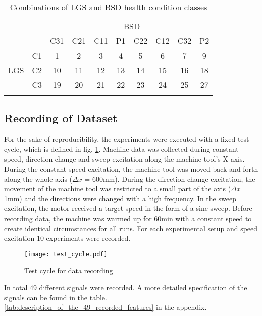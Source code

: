 \begin{center}
\begin{longtable}{c c c c c c c c c c} 
\toprule
  &  &    &     &     &     \multicolumn{2}{c}{BSD}     &     &     &    \\ 
  &  & C31 & C21 & C11 & P1  & C22 & C12 & C32 & P2 \\ 
\midrule
     & \multicolumn{1}{c|}{C1} & 1 & 2 & 3 & 4 & 5 & 6 & 7 & 9 \\ 
 LGS & \multicolumn{1}{c|}{C2}& 10 & 11 & 12 & 13 & 14 & 15 & 16 & 18 \\  
     & \multicolumn{1}{c|}{C3} & 19 & 20 & 21 & 22 & 23 & 24 & 25 & 27 \\ 
\bottomrule
\caption {Combinations of LGS and BSD health condition classes}
\label {tab:recorded_combinations_of_LGS_and_BSD_health_conditions}
\end{longtable}
\end{center}


\subsection{Recording of Dataset}
For the sake of reproducibility, the experiments were executed with a fixed test cycle, which is defined in fig. \ref{fig:test_cycle}. Machine data was collected during constant speed, direction change and sweep excitation along the machine tool's X-axis. During the constant speed excitation, the machine tool was moved back and forth along the whole axis ($\Delta x$ = 600mm). During the direction change excitation, the movement of the machine tool was restricted to a small part of the axis ($\Delta x$ = 1mm) and the directions were changed with a high frequency. In the sweep excitation, the motor received a target speed in the form of a sine sweep. Before recording data, the machine was warmed up for 60min with a constant speed to create identical circumstances for all runs. For each experimental setup and speed excitation 10 experiments were recorded. 

\begin{figure}[H]
  \centering
  \texttt{[image: test\_cycle.pdf]}
  \caption {Test cycle for data recording}
  \label{fig:test_cycle}
\end{figure}

In total 49 different signals were recorded. A more detailed specification of the signals can be found in the table. \ref{tab:description_of_the_49_recorded_features} in the appendix.

